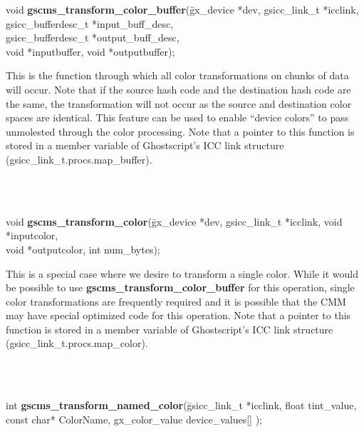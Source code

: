 \documentclass[12pt,notitlepage]{article}
\begin{document}
\begin{tabbing}
\noindent void {\bf gscms\_transform\_color\_buffer}(\=gx\_device *dev, gsicc\_link\_t *icclink, \\
\> gsicc\_bufferdesc\_t *input\_buff\_desc,  \\
\> gsicc\_bufferdesc\_t *output\_buff\_desc, \\
\> void *inputbuffer, void *outputbuffer);\\
\end{tabbing}

\begin{minipage}[h]{6.0in}
This is the function through which all color transformations on chunks of data will occur.    Note that if the source hash code and the destination hash code are the same, the transformation will not occur as the source and destination color spaces are identical.  This feature can be used to enable ``device colors'' to pass unmolested through the color processing.  Note that a pointer to this function is stored in a member variable of Ghostscript's ICC link structure (gsicc\_link\_t.procs.map\_buffer).
\end{minipage}\\
\\

\begin{tabbing}
\noindent void {\bf gscms\_transform\_color}(\=gx\_device *dev, gsicc\_link\_t *icclink,  void *inputcolor, \\
\> void *outputcolor, int num\_bytes);\\
\end{tabbing}

\begin{minipage}[h]{6.0in}
This is a special case where we desire to transform a single color.  While it would be possible to use {\bf gscms\_transform\_color\_buffer} for this operation, single color transformations are frequently required and it is possible that the CMM may have special optimized code for this operation.  Note that a pointer to this function is stored in a member variable of Ghostscript's ICC link structure (gsicc\_link\_t.procs.map\_color).
\end{minipage}\\
\\

\begin{tabbing}
\noindent int {\bf gscms\_transform\_named\_color}(\=gsicc\_link\_t *icclink,  float tint\_value, \\
\> const char* ColorName,  gx\_color\_value device\_values[] );\\
\end{tabbing}
\end{document}
